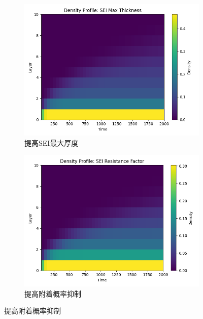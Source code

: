 \documentclass{article}
\begin{document}
\begin{figure}[H]
\begin{subfigure}[b]{0.19\textwidth}
     \end{subfigure}
     \hfill
     \begin{subfigure}[b]{0.19\textwidth}
         \centering
         \includegraphics[scale=0.2]{figs/point_density_profile_sei_max_thickness.png}
         \caption{提高SEI最大厚度}
  
     \end{subfigure}
     \hfill
     \begin{subfigure}[b]{0.19\textwidth}
         \centering
         \includegraphics[scale=0.2]{figs/point_density_profile_sei_resistance_factor.png}
         \caption{提高附着概率抑制}
        

\end{subfigure}
\end{figure}
\end{document}
